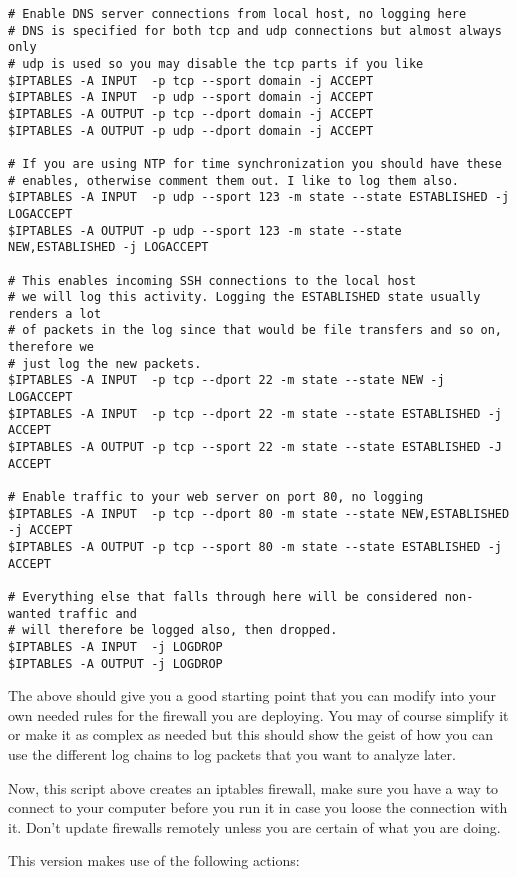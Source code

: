 \documentclass[english,twoside,openright,a4paper,12pt]{article}
\begin{document}
\begin{verbatim}
# Enable DNS server connections from local host, no logging here
# DNS is specified for both tcp and udp connections but almost always only 
# udp is used so you may disable the tcp parts if you like
$IPTABLES -A INPUT  -p tcp --sport domain -j ACCEPT
$IPTABLES -A INPUT  -p udp --sport domain -j ACCEPT
$IPTABLES -A OUTPUT -p tcp --dport domain -j ACCEPT
$IPTABLES -A OUTPUT -p udp --dport domain -j ACCEPT

# If you are using NTP for time synchronization you should have these
# enables, otherwise comment them out. I like to log them also.
$IPTABLES -A INPUT  -p udp --sport 123 -m state --state ESTABLISHED -j LOGACCEPT 
$IPTABLES -A OUTPUT -p udp --sport 123 -m state --state NEW,ESTABLISHED -j LOGACCEPT

# This enables incoming SSH connections to the local host
# we will log this activity. Logging the ESTABLISHED state usually renders a lot 
# of packets in the log since that would be file transfers and so on, therefore we 
# just log the new packets.
$IPTABLES -A INPUT  -p tcp --dport 22 -m state --state NEW -j LOGACCEPT
$IPTABLES -A INPUT  -p tcp --dport 22 -m state --state ESTABLISHED -j ACCEPT 
$IPTABLES -A OUTPUT -p tcp --sport 22 -m state --state ESTABLISHED -J ACCEPT

# Enable traffic to your web server on port 80, no logging
$IPTABLES -A INPUT  -p tcp --dport 80 -m state --state NEW,ESTABLISHED -j ACCEPT 
$IPTABLES -A OUTPUT -p tcp --sport 80 -m state --state ESTABLISHED -j ACCEPT

# Everything else that falls through here will be considered non-wanted traffic and 
# will therefore be logged also, then dropped.
$IPTABLES -A INPUT  -j LOGDROP
$IPTABLES -A OUTPUT -j LOGDROP

\end{verbatim}

The above should give you a good starting point that you can modify into your own needed rules for the firewall you are deploying. You may of course simplify it or make it as complex as needed but this should show the geist of how you can use the different log chains to log packets that you want to analyze later.

Now, this script above creates an iptables firewall, make sure you have a way to connect to your computer before you run it in case you loose the connection with it. Don't update firewalls remotely unless you are certain of what you are doing.

This version makes use of the following actions:
\end{document}

